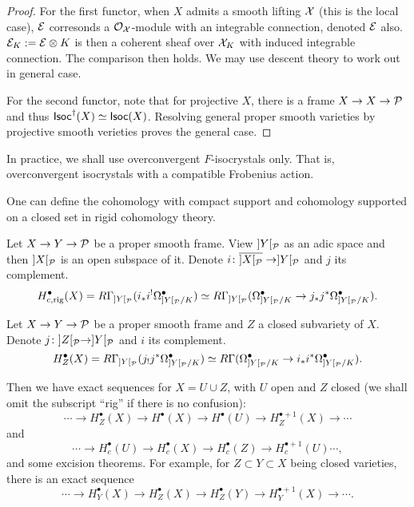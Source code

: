 \begin{proof}
    For the first functor, when $X$ admits a smooth lifting ${\mathcal {X}}$ (this is the local case), 
    ${\mathcal {E}}$ corresonds a ${\mathcal {O}}_{{\mathcal {X}}}$-module with an integrable connection, denoted ${\mathcal {E}}$ also. 
    ${\mathcal {E}}_K := {\mathcal {E}} \otimes K$ is then a coherent sheaf 
    over ${\mathcal {X}}_K$ with induced integrable connection. 
    The comparison then holds. 
    We may use descent theory to work out in general case.

    For the second functor, note that for projective $X$, 
    there is a frame $X \to X \to {\mathcal {P}}$ and thus $\mathsf{Isoc}^\dagger(X) \simeq \mathsf{Isoc}(X)$. 
    Resolving general proper smooth varieties 
    by projective smooth verieties proves the general case. 
\end{proof}

\begin{remark}
    In practice, we shall use overconvergent $F$-isocrystals only. 
    That is, overconvergent isocrystals with a compatible Frobenius action.
\end{remark}

One can define the cohomology with compact support and cohomology 
supported on a closed set in rigid cohomology theory.
\begin{definition}
    Let $X \to Y \to {\mathcal {P}}$ be a proper smooth frame. 
    View $]Y[_{\mathcal {P}}$ as an adic space and then $]X[_{\mathcal {P}}$ is an open subspace of it. 
    Denote $i\colon \overline{]X[_{\mathcal {P}}} \to ]Y[_{\mathcal {P}}$ and $j$ its complement.
    \[
        H^\bullet_{c,\mathrm{rig}}(X) = R\Gamma_{]Y[_{\mathcal {P}}} (i_*i^! \Omega_{]Y[_{\mathcal {P}}/K}^\bullet) 
        \simeq R\Gamma_{]Y[_{\mathcal {P}}} (\Omega_{]Y[_{\mathcal {P}}/K}^\bullet \to j_*j^*\Omega_{]Y[_{\mathcal {P}}/K}^\bullet).
    \]
\end{definition}

\begin{definition}
    Let $X \to Y \to {\mathcal {P}}$ be a proper smooth frame and $Z$ a closed subvariety of $X$. 
    Denote $j \colon ]Z[_{\mathcal {P}} \to ]Y[_{\mathcal {P}}$ and $i$ its complement.
    \[
        H^\bullet_Z(X) = R\Gamma_{]Y[_{\mathcal {P}}} (j_! j^* \Omega_{]Y[_{\mathcal {P}}/K}^\bullet) 
        \simeq R\Gamma(\Omega_{]Y[_{\mathcal {P}}/K}^\bullet \to i_*i^* \Omega_{]Y[_{\mathcal {P}}/K}^\bullet).
    \]
\end{definition}

Then we have exact sequences for $X=U\cup Z$, 
with $U$ open and $Z$ closed 
(we shall omit the subscript ``rig'' if there is no confusion):
\[
    \cdots \to H^\bullet_Z(X) \to H^\bullet(X) \to H^\bullet(U) \to H^{\bullet+1}_Z(X) \to \cdots
\]
and 
\[
    \cdots \to H^\bullet_c(U) \to H^\bullet_c(X) \to H^\bullet_c(Z) \to H^{\bullet+1}_c(U) \cdots,
\]
and some excision theorems. 
For example, for $Z \subset Y \subset X$ being closed varieties, 
there is an exact sequence
\[
    \cdots \to H^\bullet_Y(X) \to H^\bullet_Z(X) \to H^\bullet_Z(Y) \to H^{\bullet+1}_Y(X) \to \cdots.
\]

